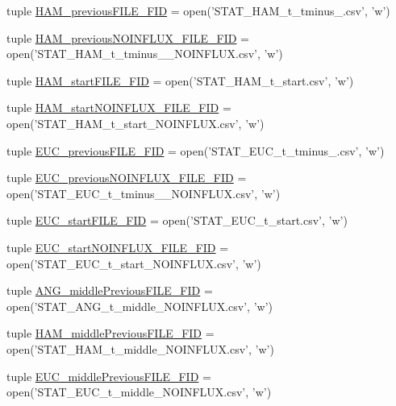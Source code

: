 \begin{DoxyCompactItemize}
\item 
tuple \hyperlink{a00130_a3aad86d2cdbfb6f36b4b563b190d76c9}{H\-A\-M\-\_\-previous\-F\-I\-L\-E\-\_\-\-F\-I\-D} = open('S\-T\-A\-T\-\_\-\-H\-A\-M\-\_\-t\-\_\-tminus\-\_.\-csv', 'w')
\item 
tuple \hyperlink{a00130_a621d86851e86f9c83bb0add9ec741d7f}{H\-A\-M\-\_\-previous\-N\-O\-I\-N\-F\-L\-U\-X\-\_\-\-F\-I\-L\-E\-\_\-\-F\-I\-D} = open('S\-T\-A\-T\-\_\-\-H\-A\-M\-\_\-t\-\_\-tminus\-\_\-\_\-\-N\-O\-I\-N\-F\-L\-U\-X.\-csv', 'w')
\item 
tuple \hyperlink{a00130_abb14887e587e1107fc13046ad313077e}{H\-A\-M\-\_\-start\-F\-I\-L\-E\-\_\-\-F\-I\-D} = open('S\-T\-A\-T\-\_\-\-H\-A\-M\-\_\-t\-\_\-start.\-csv', 'w')
\item 
tuple \hyperlink{a00130_ab8a3b402c0b418cc290889a5f6482280}{H\-A\-M\-\_\-start\-N\-O\-I\-N\-F\-L\-U\-X\-\_\-\-F\-I\-L\-E\-\_\-\-F\-I\-D} = open('S\-T\-A\-T\-\_\-\-H\-A\-M\-\_\-t\-\_\-start\-\_\-\-N\-O\-I\-N\-F\-L\-U\-X.\-csv', 'w')
\item 
tuple \hyperlink{a00130_a3548edac9afffda077dcbd2876616b39}{E\-U\-C\-\_\-previous\-F\-I\-L\-E\-\_\-\-F\-I\-D} = open('S\-T\-A\-T\-\_\-\-E\-U\-C\-\_\-t\-\_\-tminus\-\_.\-csv', 'w')
\item 
tuple \hyperlink{a00130_aa2efc59329473a7bbeaf3ce32ec4dc3d}{E\-U\-C\-\_\-previous\-N\-O\-I\-N\-F\-L\-U\-X\-\_\-\-F\-I\-L\-E\-\_\-\-F\-I\-D} = open('S\-T\-A\-T\-\_\-\-E\-U\-C\-\_\-t\-\_\-tminus\-\_\-\_\-\-N\-O\-I\-N\-F\-L\-U\-X.\-csv', 'w')
\item 
tuple \hyperlink{a00130_a3d812ff298612e6aae54e7a9abfddbf2}{E\-U\-C\-\_\-start\-F\-I\-L\-E\-\_\-\-F\-I\-D} = open('S\-T\-A\-T\-\_\-\-E\-U\-C\-\_\-t\-\_\-start.\-csv', 'w')
\item 
tuple \hyperlink{a00130_a8ae5873fd9b162495a512e314047e930}{E\-U\-C\-\_\-start\-N\-O\-I\-N\-F\-L\-U\-X\-\_\-\-F\-I\-L\-E\-\_\-\-F\-I\-D} = open('S\-T\-A\-T\-\_\-\-E\-U\-C\-\_\-t\-\_\-start\-\_\-\-N\-O\-I\-N\-F\-L\-U\-X.\-csv', 'w')
\item 
tuple \hyperlink{a00130_aa5eb16eef2c90e2ccc991eb176280f21}{A\-N\-G\-\_\-middle\-Previous\-F\-I\-L\-E\-\_\-\-F\-I\-D} = open('S\-T\-A\-T\-\_\-\-A\-N\-G\-\_\-t\-\_\-middle\-\_\-\-N\-O\-I\-N\-F\-L\-U\-X.\-csv', 'w')
\item 
tuple \hyperlink{a00130_aaf0dd6e74d88a7cf2e909301b422c17d}{H\-A\-M\-\_\-middle\-Previous\-F\-I\-L\-E\-\_\-\-F\-I\-D} = open('S\-T\-A\-T\-\_\-\-H\-A\-M\-\_\-t\-\_\-middle\-\_\-\-N\-O\-I\-N\-F\-L\-U\-X.\-csv', 'w')
\item 
tuple \hyperlink{a00130_afcb9ec3ed11cfcacae8f796af7605425}{E\-U\-C\-\_\-middle\-Previous\-F\-I\-L\-E\-\_\-\-F\-I\-D} = open('S\-T\-A\-T\-\_\-\-E\-U\-C\-\_\-t\-\_\-middle\-\_\-\-N\-O\-I\-N\-F\-L\-U\-X.\-csv', 'w')

\end{DoxyCompactItemize}

